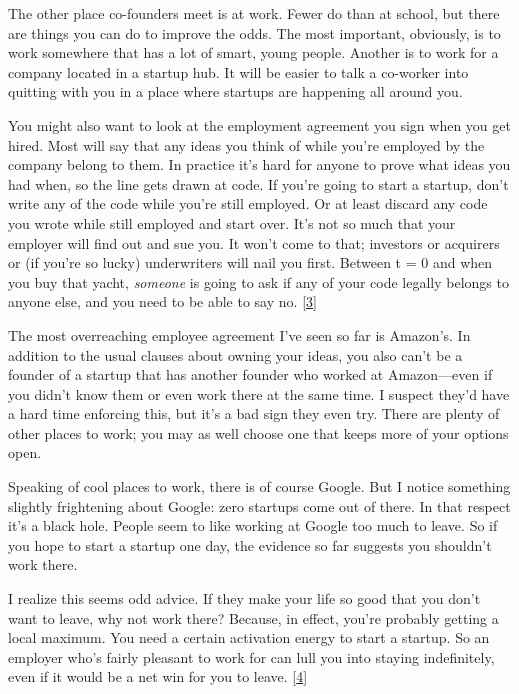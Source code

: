 The other place co-founders meet is at work. Fewer do than at school,
but there are things you can do to improve the odds. The most important,
obviously, is to work somewhere that has a lot of smart, young people.
Another is to work for a company located in a startup hub. It will be
easier to talk a co-worker into quitting with you in a place where
startups are happening all around you.

You might also want to look at the employment agreement you sign when
you get hired. Most will say that any ideas you think of while you're
employed by the company belong to them. In practice it's hard for anyone
to prove what ideas you had when, so the line gets drawn at code. If
you're going to start a startup, don't write any of the code while
you're still employed. Or at least discard any code you wrote while
still employed and start over. It's not so much that your employer will
find out and sue you. It won't come to that; investors or acquirers or
(if you're so lucky) underwriters will nail you first. Between t = 0 and
when you buy that yacht, \emph{someone} is going to ask if any of your
code legally belongs to anyone else, and you need to be able to say no.
{[}\hyperref[f3n]{3}{]}

The most overreaching employee agreement I've seen so far is Amazon's.
In addition to the usual clauses about owning your ideas, you also can't
be a founder of a startup that has another founder who worked at
Amazon---even if you didn't know them or even work there at the same
time. I suspect they'd have a hard time enforcing this, but it's a bad
sign they even try. There are plenty of other places to work; you may as
well choose one that keeps more of your options open.

Speaking of cool places to work, there is of course Google. But I notice
something slightly frightening about Google: zero startups come out of
there. In that respect it's a black hole. People seem to like working at
Google too much to leave. So if you hope to start a startup one day, the
evidence so far suggests you shouldn't work there.

I realize this seems odd advice. If they make your life so good that you
don't want to leave, why not work there? Because, in effect, you're
probably getting a local maximum. You need a certain activation energy
to start a startup. So an employer who's fairly pleasant to work for can
lull you into staying indefinitely, even if it would be a net win for
you to leave. {[}\hyperref[f4n]{4}{]}

